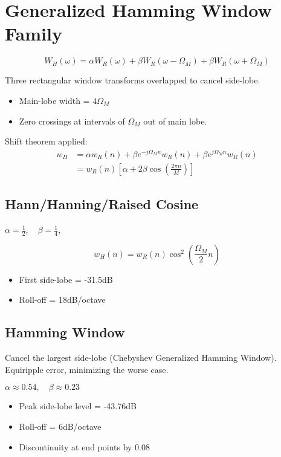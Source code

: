 \documentclass[11pt]{article}
\begin{document}
\section*{Generalized Hamming Window Family}

\begin{equation*}
W_H(\omega) = \alpha W_R(\omega) + \beta W_R(\omega - \Omega_M) + \beta W_R(\omega + \Omega_M)
\end{equation*}

Three rectangular window transforms overlapped to cancel side-lobe.

\begin{itemize}
\item Main-lobe width = $4\Omega_M$
\item Zero crossings at intervals of $\Omega_M$ out of main lobe.
\end{itemize}

Shift theorem applied:
\begin{align*}
w_H &= \alpha w_R(n) + \beta e^{-j\Omega_Mn} w_R(n) + \beta e^{j\Omega_Mn}w_R(n) \\
    &= w_R(n) [\alpha + 2\beta \cos(\frac{2\pi n}{M})]
\end{align*}

\subsection*{Hann/Hanning/Raised Cosine}\indent

$\alpha = \frac{1}{2},\quad \beta = \frac{1}{4}$,

\[w_H(n) = w_R(n) \cos^2(\frac{\Omega_M}{2}n)\]

\begin{itemize}
\item First side-lobe = -31.5dB
\item Roll-off = 18dB/octave
\end{itemize}

\subsection*{Hamming Window}\indent

Cancel the largest side-lobe (Chebyshev Generalized Hamming Window). Equiripple error, minimizing the worse case.

$\alpha \approx 0.54,\quad \beta \approx 0.23$

\begin{itemize}
\item Peak side-lobe level = -43.76dB
\item Roll-off = 6dB/octave
\item Discontinuity at end points by 0.08
\end{itemize}
\end{document}

